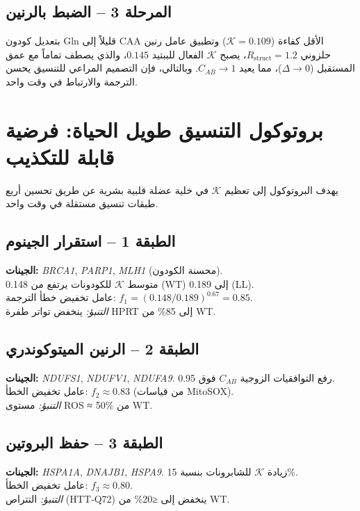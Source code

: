 \documentclass[11pt,a4paper]{article}
\newcommand{\REL}{\mathcal{K}}
\begin{document}
	\subsection{المرحلة 3 – الضبط بالرنين}
	بتعديل كودون Gln قليلاً إلى CAA الأقل كفاءة (\(\REL=0.109\)) وتطبيق عامل رنين حلزوني \(R_{\mathrm{struct}}=1.2\)، يصبح \(\REL\) الفعال للببتيد \(0.145\)، والذي يصطف تماماً مع عمق المستقبل (\(\Delta \to 0\))، مما يعيد \(C_{AB} \to 1\). وبالتالي، فإن التصميم المراعي للتنسيق يحسن الترجمة والارتباط في وقت واحد.
	
	\section{بروتوكول التنسيق طويل الحياة: فرضية قابلة للتكذيب}
	\label{sec:LL}
	يهدف البروتوكول إلى تعظيم \(\REL\) في خلية عضلة قلبية بشرية عن طريق تحسين أربع طبقات تنسيق مستقلة في وقت واحد.
	
	\subsection{الطبقة 1 – استقرار الجينوم}
	\textbf{الجينات:} \emph{BRCA1}, \emph{PARP1}, \emph{MLH1} (محسنة الكودون).\\
	متوسط \(\REL\) للكودونات يرتفع من 0.148 (WT) إلى 0.189 (LL).\\
	عامل تخفيض خطأ الترجمة: \(f_1 = (0.148/0.189)^{0.67} = 0.85\).\\
	\textit{التنبؤ:} ينخفض تواتر طفرة HPRT إلى 85\% من WT.
	
	\subsection{الطبقة 2 – الرنين الميتوكوندري}
	\textbf{الجينات:} \emph{NDUFS1}, \emph{NDUFV1}, \emph{NDUFA9}. رفع التوافقيات الزوجية \(C_{AB}\) فوق 0.95.\\
	عامل تخفيض الخطأ: \(f_2 \approx 0.83\) (من قياسات MitoSOX).\\
	\textit{التنبؤ:} مستوى ROS ≈ 50\% من WT.
	
	\subsection{الطبقة 3 – حفظ البروتين}
	\textbf{الجينات:} \emph{HSPA1A}, \emph{DNAJB1}, \emph{HSPA9}. زيادة \(\REL\) للشابرونات بنسبة 15\%.\\
	عامل تخفيض الخطأ: \(f_3 \approx 0.80\).\\
	\textit{التنبؤ:} التتراص (HTT‑Q72) ينخفض إلى ≤20\% من WT.
	
\end{document}
